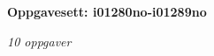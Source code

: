 \centerline{\bf Oppgavesett: i01280no-i01289no}
\vskip 10pt
\centerline{\it 10 oppgaver}\vskip 10pt
\vskip 10pt
